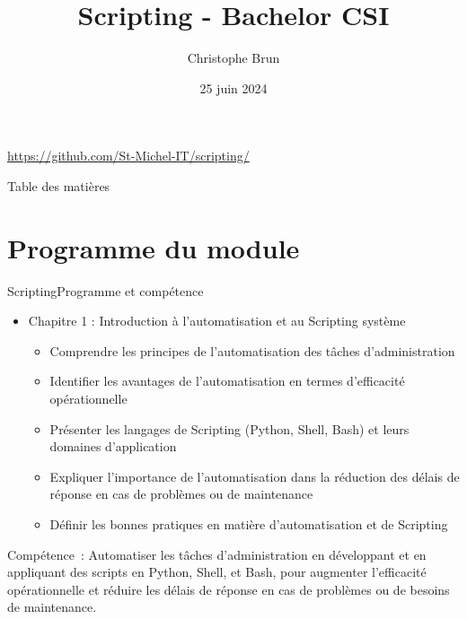 \documentclass{beamer}
\title{Scripting - Bachelor CSI}
\author{Christophe Brun}
\institute{Campus Saint-Michel IT}
\date{25 juin 2024}
\begin{document}
    \begin{frame}
        \titlepage
        \bigbreak
        \centering
        \url{https://github.com/St-Michel-IT/scripting/}
    \end{frame}

    \begin{frame}{Table des matières}
        \tableofcontents
    \end{frame}


    \section{Programme du module}\label{sec:programme-du-module}
    \begin{frame}{Scripting}{Programme et compétence}
        \begin{itemize}
            \item Chapitre 1 : Introduction à l'automatisation et au Scripting système
            \begin{itemize}
                \item Comprendre les principes de l'automatisation des tâches d'administration
                \item Identifier les avantages de l'automatisation en termes d'efficacité opérationnelle
                \item Présenter les langages de Scripting (Python, Shell, Bash) et leurs domaines d'application
                \item Expliquer l'importance de l'automatisation dans la réduction des délais de réponse en cas de problèmes ou de maintenance
                \item Définir les bonnes pratiques en matière d'automatisation et de Scripting
            \end{itemize}
        \end{itemize}
        Compétence~:
        \bigbreak
        Automatiser les tâches d'administration en développant et en appliquant des scripts en Python, Shell, et Bash, pour augmenter l'efficacité opérationnelle et réduire les délais de réponse en cas de problèmes ou de besoins de maintenance.
    \end{frame}
\end{document}
